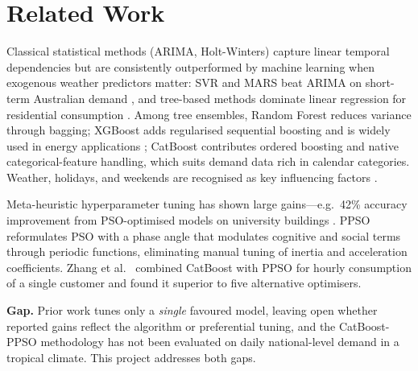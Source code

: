 \section{Related Work}\label{sec:related}

Classical statistical methods (ARIMA, Holt-Winters) capture linear temporal dependencies but are consistently outperformed by machine learning when exogenous weather predictors matter: SVR and MARS beat ARIMA on short-term Australian demand \parencite{almusaylh2018forecasting}, and tree-based methods dominate linear regression for residential consumption \parencite{schirmer2019evaluation}. Among tree ensembles, Random Forest \parencite{breiman2001randomforest} reduces variance through bagging; XGBoost \parencite{chen2016xgboost} adds regularised sequential boosting and is widely used in energy applications \parencite{khan2020hybrid}; CatBoost \parencite{prokhorenkova2018catboost} contributes ordered boosting and native categorical-feature handling, which suits demand data rich in calendar categories. Weather, holidays, and weekends are recognised as key influencing factors \parencite{khan2021influencing}.

Meta-heuristic hyperparameter tuning has shown large gains---e.g.\ 42\% accuracy improvement from PSO-optimised models on university buildings \parencite{li2020datadrivenstrategy}. PPSO \parencite{ghasemi2019ppso} reformulates PSO with a phase angle that modulates cognitive and social terms through periodic functions, eliminating manual tuning of inertia and acceleration coefficients. Zhang et al.\ \parencite{zhang2023catboostppso} combined CatBoost with PPSO for hourly consumption of a single customer and found it superior to five alternative optimisers.

\textbf{Gap.} Prior work tunes only a \emph{single} favoured model, leaving open whether reported gains reflect the algorithm or preferential tuning, and the CatBoost-PPSO methodology has not been evaluated on daily national-level demand in a tropical climate. This project addresses both gaps.

